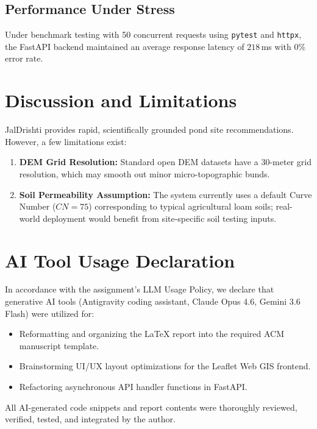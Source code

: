 \documentclass[manuscript,screen,review]{acmart}
\begin{document}
\subsection{Performance Under Stress}
Under benchmark testing with 50 concurrent requests using \texttt{pytest} and \texttt{httpx}, the FastAPI backend maintained an average response latency of $218$\,ms with $0\%$ error rate.

\section{Discussion and Limitations}
\label{sec:discussion}
JalDrishti provides rapid, scientifically grounded pond site recommendations. However, a few limitations exist:
\begin{enumerate}
    \item \textbf{DEM Grid Resolution:} Standard open DEM datasets have a 30-meter grid resolution, which may smooth out minor micro-topographic bunds.
    \item \textbf{Soil Permeability Assumption:} The system currently uses a default Curve Number ($CN=75$) corresponding to typical agricultural loam soils; real-world deployment would benefit from site-specific soil testing inputs.
\end{enumerate}

\section{AI Tool Usage Declaration}
\label{sec:ai-usage}
In accordance with the assignment's LLM Usage Policy, we declare that generative AI tools (Antigravity coding assistant, Claude Opus 4.6, Gemini 3.6 Flash) were utilized for:
\begin{itemize}
    \item Reformatting and organizing the LaTeX report into the required ACM manuscript template.
    \item Brainstorming UI/UX layout optimizations for the Leaflet Web GIS frontend.
    \item Refactoring asynchronous API handler functions in FastAPI.
\end{itemize}
All AI-generated code snippets and report contents were thoroughly reviewed, verified, tested, and integrated by the author.

\appendix
\end{document}
